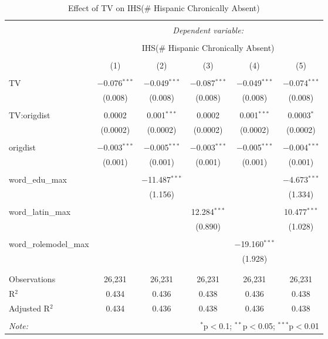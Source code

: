 
\begin{table}[!htbp] \centering 
  \caption{Effect of TV on IHS(\# Hispanic Chronically Absent)} 
  \label{} 
\begin{tabular}{@{\extracolsep{-2pt}}lccccc} 
\\[-1.8ex]\hline 
\hline \\[-1.8ex] 
 & \multicolumn{5}{c}{\textit{Dependent variable:}} \\ 
\cline{2-6} 
\\[-1.8ex] & \multicolumn{5}{c}{IHS(\# Hispanic Chronically Absent)} \\ 
\\[-1.8ex] & (1) & (2) & (3) & (4) & (5)\\ 
\hline \\[-1.8ex] 
 TV & $-$0.076$^{***}$ & $-$0.049$^{***}$ & $-$0.087$^{***}$ & $-$0.049$^{***}$ & $-$0.074$^{***}$ \\ 
  & (0.008) & (0.008) & (0.008) & (0.008) & (0.008) \\ 
  & & & & & \\ 
 TV:origdist & 0.0002 & 0.001$^{***}$ & 0.0002 & 0.001$^{***}$ & 0.0003$^{*}$ \\ 
  & (0.0002) & (0.0002) & (0.0002) & (0.0002) & (0.0002) \\ 
  & & & & & \\ 
 origdist & $-$0.003$^{***}$ & $-$0.005$^{***}$ & $-$0.003$^{***}$ & $-$0.005$^{***}$ & $-$0.004$^{***}$ \\ 
  & (0.001) & (0.001) & (0.001) & (0.001) & (0.001) \\ 
  & & & & & \\ 
 word\_edu\_max &  & $-$11.487$^{***}$ &  &  & $-$4.673$^{***}$ \\ 
  &  & (1.156) &  &  & (1.334) \\ 
  & & & & & \\ 
 word\_latin\_max &  &  & 12.284$^{***}$ &  & 10.477$^{***}$ \\ 
  &  &  & (0.890) &  & (1.028) \\ 
  & & & & & \\ 
 word\_rolemodel\_max &  &  &  & $-$19.160$^{***}$ &  \\ 
  &  &  &  & (1.928) &  \\ 
  & & & & & \\ 
\hline \\[-1.8ex] 
Observations & 26,231 & 26,231 & 26,231 & 26,231 & 26,231 \\ 
R$^{2}$ & 0.434 & 0.436 & 0.438 & 0.436 & 0.438 \\ 
Adjusted R$^{2}$ & 0.434 & 0.436 & 0.438 & 0.436 & 0.438 \\ 
\hline 
\hline \\[-1.8ex] 
\textit{Note:}  & \multicolumn{5}{r}{$^{*}$p$<$0.1; $^{**}$p$<$0.05; $^{***}$p$<$0.01} \\ 
\end{tabular} 
\end{table} 
